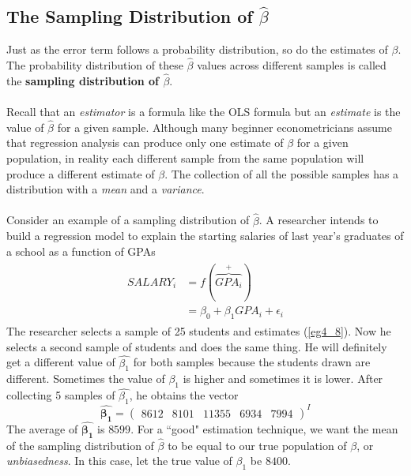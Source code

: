 \documentclass[11pt]{article}
\begin{document}
\subsection{The Sampling Distribution of $\hat{\beta}$}
Just as the error term follows a probability distribution, so do the estimates of $\beta$. The probability distribution of these $\hat{\beta}$ values across different samples is called the \textbf{sampling distribution of $\hat{\beta}$}.\\ \\
Recall that an \textit{estimator} is a formula like the OLS formula but an \textit{estimate} is the value of $\hat{\beta}$ for a given sample.
Although many beginner econometricians assume that regression analysis can produce only one estimate of $\beta$ for a given population, in reality each different sample from the same population will produce a different estimate of $\beta$. The collection of all the possible samples has a distribution with a \textit{mean} and a \textit{variance}.\\ \\
Consider an example of a sampling distribution of $\hat{\beta}$. A researcher intends to build a regression model to explain the starting salaries of last year's graduates of a school as a function of GPAs
\begin{align}
\label{eg4_8}
\begin{split}
SALARY_i &= f(\overbrace{GPA_i}^{+})\\
&=\beta_0 + \beta_1GPA_i + \epsilon_i
\end{split}
\end{align}
The researcher selects a sample of 25 students and estimates (\ref{eg4_8}). Now he selects a second sample of students and does the same thing. He will definitely get a different value of $\hat{\beta_1}$ for both samples because the students drawn are different. Sometimes the value of $\beta_1$ is higher and sometimes it is lower. After collecting 5 samples of $\hat{\beta_1}$, he obtains the vector
$$\boldsymbol{\hat{\beta_1}} = \begin{pmatrix}
8612 & 8101& 11355 & 6934 & 7994
\end{pmatrix}^I$$
The average of $\boldsymbol{\hat{\beta_1}}$ is $8599$. For a ``good" estimation technique, we want the mean of the sampling distribution of $\hat{\beta}$ to be equal to our true population of $\beta$, or \textit{unbiasedness}. In this case, let the true value of $\beta_1$ be $8400$.
\end{document}
